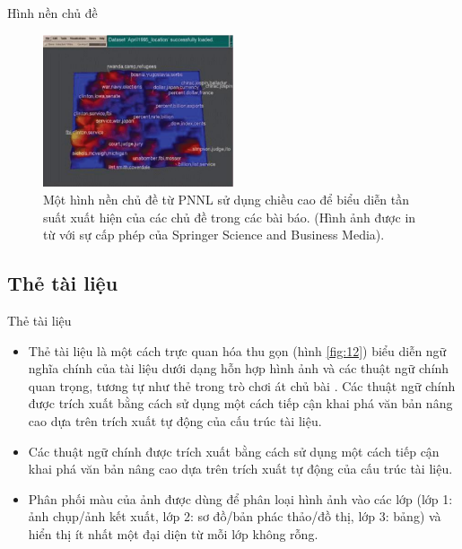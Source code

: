 \documentclass[10pt]{beamer}
\theoremstyle{remark}
\theoremstyle{definition}
\begin{document}
\begin{frame}{Hình nền chủ đề}
	\begin{figure}[h!]
        \centering
        \includegraphics[width=0.5\textwidth]{11.png}
        \caption{Một hình nền chủ đề từ PNNL sử dụng chiều cao để biểu diễn tần suất xuất hiện của các chủ đề trong các bài báo. (Hình ảnh được in từ \cite{407} với sự cấp phép của  Springer Science and Business Media).}
        \label{fig:11}
    \end{figure}
\end{frame}

\subsection{Thẻ tài liệu}

\begin{frame}{Thẻ tài liệu}
	\begin{itemize}
		\item Thẻ tài liệu là một cách trực quan hóa thu gọn (hình \ref{fig:12}) biểu diễn ngữ nghĩa chính của tài liệu dưới dạng hỗn hợp hình ảnh và các thuật ngữ chính quan trọng, tương tự như thẻ trong trò chơi át chủ bài \cite{400}.
		Các thuật ngữ chính được trích xuất bằng cách sử dụng một cách tiếp cận khai phá văn bản nâng cao dựa trên trích xuất tự động của cấu trúc tài liệu.
		\item Các thuật ngữ chính được trích xuất bằng cách sử dụng một cách tiếp cận khai phá văn bản nâng cao dựa trên trích xuất tự động của cấu trúc tài liệu.
		\item Phân phối màu của ảnh được dùng để phân loại hình ảnh vào các lớp (lớp 1: ảnh chụp/ảnh kết xuất, lớp 2: sơ đồ/bản phác thảo/đồ thị, lớp 3: bảng) và hiển thị ít nhất một đại diện từ mỗi lớp không rỗng.
	\end{itemize}
\end{frame}
\end{document}
